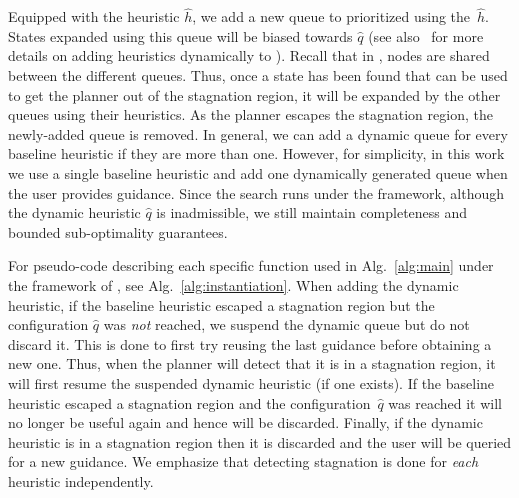 \documentclass{article}
\begin{document}
Equipped with the heuristic $\hat{h}$, we add a new queue to \mhastar prioritized using the~$\hat{h}$. %
States expanded using this queue will be biased towards $\hat{q}$ (see also~\cite{INL15} for more details on adding heuristics dynamically to \mhastar
).
Recall that in \mhastar, nodes are shared between the different queues.
Thus, once a state has been found that can be used to get the planner out of the stagnation region, it will be expanded by the other queues using their heuristics.
As the planner escapes the stagnation region,
the newly-added queue is removed.
In general,  we can add a dynamic queue for every baseline heuristic if they are more than one. However, for simplicity, in this work we use a single baseline heuristic and add one dynamically generated queue when the user provides guidance. Since the search runs under the \mhastar framework, although the dynamic heuristic $\hat{q}$ is inadmissible, we still maintain completeness and bounded sub-optimality guarantees.

For pseudo-code describing each specific function used  in Alg.~\ref{alg:main} under the framework of \mhastar, see Alg.~\ref{alg:instantiation}.
When adding the dynamic heuristic, if the baseline heuristic escaped a stagnation region but the configuration $\hat{q}$ was \emph{not} reached, we suspend the dynamic queue but do not discard it. 
This is done to first try reusing the last guidance before obtaining a new one. 
Thus, when the planner will detect that it is in a stagnation region, it will first resume the suspended dynamic heuristic (if one exists).
%
If the baseline heuristic escaped a stagnation region and the configuration~$\hat{q}$ was  reached it will no longer be useful again and hence will be discarded.
Finally, if the dynamic heuristic is in a stagnation region then it is discarded and the user will be queried for a new guidance. 
We emphasize that detecting stagnation is done for \emph{each} heuristic independently.
\end{document}
